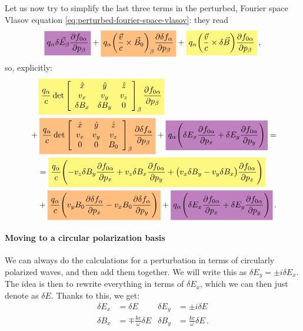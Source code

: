 \documentclass[main.tex]{subfiles}
\begin{document}
Let us now try to simplify the last three terms in the perturbed, Fourier space Vlasov equation \eqref{eq:perturbed-fourier-space-vlasov}: they read 
%
\begin{align}
\hlc{violet}{q_\alpha \delta \vec{E}_\beta \pdv{f_{0 \alpha }}{p_\beta } }
+ \hlc{orange}{q_\alpha \qty( \frac{\vec{v}}{c} \times \vec{B}_0)_\beta \pdv{ \delta f_\alpha }{p_\beta }}
+ \hlc{yellow}{q_\alpha \qty( \frac{\vec{v}}{c} \times \delta \vec{B}) 
\pdv{f_{0 \alpha }}{p_\beta }}
\,,
\end{align}
%
so, explicitly: 
%
\begin{align}
\begin{split}
&\phantom{=}\  \hlc{yellow}{\frac{q_\alpha}{c} \det \left[\begin{array}{ccc}
\hat{x} & \hat{y} & \hat{z} \\ 
v_x & v_y & v_z \\ 
\delta B_x & \delta B_y & 0
\end{array}\right]_\beta 
\pdv{f_{0 \alpha }}{p_\beta }} \\
&+ \hlc{orange}{\frac{q_\alpha}{c} \det \left[\begin{array}{ccc}
\hat{x} & \hat{y} & \hat{z} \\ 
v_x & v_y & v_z \\ 
0 & 0 & B_0 
\end{array}\right]_\beta 
\pdv{ \delta f_\alpha }{p_\beta }}
+ \hlc{violet}{q_\alpha
\qty(\delta E_x \pdv{f_{0 \alpha }}{p_x} + \delta E_y \pdv{f_{0 \alpha }}{p_y})} =
\end{split}  \\
\begin{split}
&= \hlc{yellow}{\frac{q_\alpha}{c} \qty( - v_z \delta B_y \pdv{f_{0 \alpha }}{p_x} + v_z \delta B_x \pdv{f_{0 \alpha }}{p_y} + \qty(v_x \delta B_y - v_y \delta B_x) \pdv{f_{0\alpha} }{p_z})} 
\\ 
& + \hlc{orange}{\frac{q_\alpha}{c} \qty(
    v_y B_0 \pdv{ \delta f_\alpha }{p_x} - v_x B_0 \pdv{ \delta f_\alpha }{p_y}
)}
+ \hlc{violet}{q_\alpha \qty(
    \delta E_x \pdv{f_{0 \alpha }}{p_x} +
    \delta E_y \pdv{f_{0 \alpha }}{p_y}
)}
\,.
\end{split}
\end{align}

\paragraph{Moving to a circular polarization basis}

We can always do the calculations for a perturbation in terms of circularly polarized waves, and then add them together. 
We will write this as \(\delta E_y = \pm i \delta E_x\). 
The idea is then to rewrite everything in terms of \(\delta E_x\), which we can then just denote as \(\delta E\).  
Thanks to this, we get: 
%
\begin{align}
\delta E_x &= \delta E  &
\delta E_y &= \pm i \delta E  \\
\delta B_x &= \mp \frac{kc}{\omega } \delta E  &
\delta B_y &= \frac{kc}{\omega } \delta E
\,.
\end{align}
%
\end{document}
